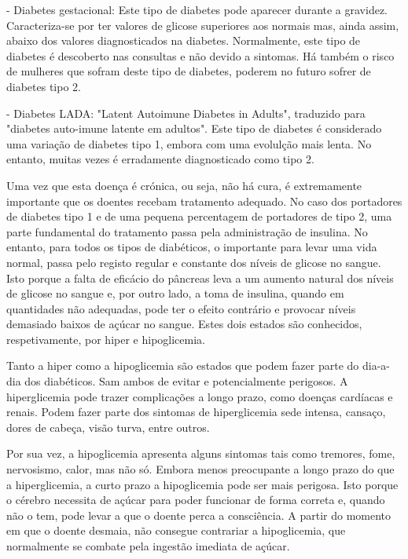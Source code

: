 - Diabetes gestacional: Este tipo de diabetes pode aparecer durante a gravidez. Caracteriza-se por ter valores de glicose superiores aos normais mas, ainda assim, abaixo dos valores diagnosticados na diabetes. Normalmente, este tipo de diabetes é descoberto nas consultas e não devido a sintomas. Há também o risco de mulheres que sofram deste tipo de diabetes, poderem no futuro sofrer de diabetes tipo 2.

- Diabetes LADA: "Latent Autoimune Diabetes in Adults", traduzido para "diabetes auto-imune latente em adultos". Este tipo de diabetes é considerado uma variação de diabetes tipo 1, embora com uma evolulção mais lenta. No entanto, muitas vezes é erradamente diagnosticado como tipo 2.

Uma vez que esta doença é crónica, ou seja, não há cura, é extremamente importante que os doentes recebam tratamento adequado. No caso dos portadores de diabetes tipo 1 e de uma pequena percentagem de portadores de tipo 2, uma parte fundamental do tratamento passa pela administração de insulina. No entanto, para todos os tipos de diabéticos, o importante para levar uma vida normal, passa pelo registo regular e constante dos níveis de glicose no sangue. Isto porque a falta de eficácio do pâncreas leva a um aumento natural dos níveis de glicose no sangue e, por outro lado, a toma de insulina, quando em quantidades não adequadas, pode ter o efeito contrário e provocar níveis demasiado baixos de açúcar no sangue. Estes dois estados são conhecidos, respetivamente, por hiper e hipoglicemia.

Tanto a hiper como a hipoglicemia são estados que podem fazer parte do dia-a-dia dos diabéticos. Sam ambos de evitar e potencialmente perigosos. A hiperglicemia pode trazer complicações a longo prazo, como doenças cardíacas e renais. Podem fazer parte dos sintomas de hiperglicemia sede intensa, cansaço, dores de cabeça, visão turva, entre outros.

Por sua vez, a hipoglicemia apresenta alguns sintomas tais como tremores, fome, nervosismo, calor, mas não só. Embora menos preocupante a longo prazo do que a hiperglicemia, a curto prazo a hipoglicemia pode ser mais perigosa. Isto porque o cérebro necessita de açúcar para poder funcionar de forma correta e, quando não o tem, pode levar a que o doente perca a consciência. A partir do momento em que o doente desmaia, não consegue contrariar a hipoglicemia, que normalmente se combate pela ingestão imediata de açúcar.


